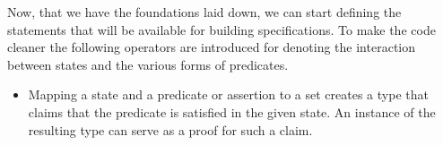 Now, that we have the foundations laid down, we can start defining the statements that will be available for building specifications. To make the code cleaner the following operators are introduced for denoting the interaction between states and the various forms of predicates.
\begin{itemize}
    \item Mapping a state and a predicate or assertion to a set creates a type that claims that the predicate is satisfied in the given state. An instance of the resulting type can serve as a proof for such a claim.
    \begin{code}
        \>[2]\AgdaSpace{}%
        \AgdaSymbol{:}\AgdaSpace{}%
        \AgdaSpace{}%
        \AgdaSpace{}%
        \AgdaSpace{}%
        \AgdaSpace{}%
        \<%
        \\
        \>[2]\AgdaSpace{}%
        \AgdaSpace{}%
        \AgdaSpace{}%
        \AgdaSymbol{=}\AgdaSpace{}%
        \AgdaSpace{}%
        \AgdaSpace{}%
        \AgdaSpace{}%
        \<%
        \\
        \\[\AgdaEmptyExtraSkip]%
        \>[2]\AgdaSpace{}%
        \AgdaSymbol{:}\AgdaSpace{}%
        \AgdaSpace{}%
        \AgdaSpace{}%
        \AgdaSpace{}%
        \AgdaSpace{}%
        \<%
        \\
        \>[2]\AgdaSpace{}%
        \AgdaSpace{}%
        \AgdaSpace{}%
        \AgdaSymbol{=}\AgdaSpace{}%
        \AgdaSpace{}%
        \<%
    \end{code}
    

\end{itemize}
